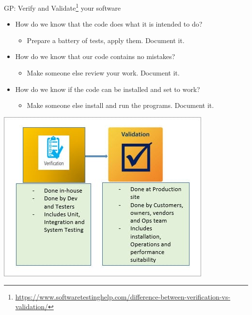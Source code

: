 \documentclass[ignorenonframetext,]{beamer}
\providecommand{\tightlist}{%
  \setlength{\itemsep}{0pt}\setlength{\parskip}{0pt}}
\begin{document}
\begin{frame}{%
\protect\hypertarget{gp-verify-and-validate-your-software}{%
GP: Verify and Validate\footnote{\url{https://www.softwaretestinghelp.com/difference-between-verification-vs-validation/}}}  your software}

\begin{itemize}
\tightlist
\item
  How do we know that the code does what it is intended to do?

  \begin{itemize}
  \tightlist
  \item
    Prepare a battery of tests, apply them. Document it.
  \end{itemize}
\item
  How do we know that our code contains no mistakes?

  \begin{itemize}
  \tightlist
  \item
    Make someone else review your work. Document it.
  \end{itemize}
\item
  How do we know if the code can be installed and set to work?

  \begin{itemize}
  \tightlist
  \item
    Make someone else install and run the programs. Document it.
  \end{itemize}
\end{itemize}

\begin{center}
\includegraphics[height=0.4\textheight]{"images/Verification-and-Validation"}
\end{center}


\end{frame}
\end{document}
